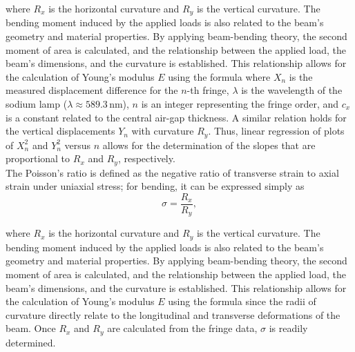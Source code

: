 \documentclass[a4paper,11pt]{article}
\begin{document}
where \(R_x\) is the horizontal curvature and \(R_y\) is the vertical curvature. The bending moment induced by the applied loads is also related to the beam's geometry and material properties. By applying beam-bending theory, the second moment of area is calculated, and the relationship between the applied load, the beam's dimensions, and the curvature is established. This relationship allows for the calculation of Young's modulus \(E\) using the formula
where \(X_n\) is the measured displacement difference for the \(n\)-th fringe, \(\lambda\) is the wavelength of the sodium lamp (\(\lambda \approx 589.3\,\mathrm{nm}\)), \(n\) is an integer representing the fringe order, and \(c_x\) is a constant related to the central air-gap thickness. A similar relation holds for the vertical displacements \(Y_n\) with curvature \(R_y\). Thus, linear regression of plots of \(X_n^2\) and \(Y_n^2\) versus \(n\) allows for the determination of the slopes that are proportional to \(R_x\) and \(R_y\), respectively.\\

The Poisson's ratio is defined as the negative ratio of transverse strain to axial strain under uniaxial stress; for bending, it can be expressed simply as
\begin{equation}
\sigma = \frac{R_x}{R_y},
\end{equation}

where \(R_x\) is the horizontal curvature and \(R_y\) is the vertical curvature. The bending moment induced by the applied loads is also related to the beam's geometry and material properties. By applying beam-bending theory, the second moment of area is calculated, and the relationship between the applied load, the beam's dimensions, and the curvature is established. This relationship allows for the calculation of Young's modulus \(E\) using the formula
since the radii of curvature directly relate to the longitudinal and transverse deformations of the beam. Once \(R_x\) and \(R_y\) are calculated from the fringe data, \(\sigma\) is readily determined.\\
\end{document}
